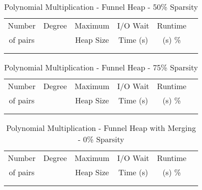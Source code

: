 \documentclass[11pt, one-sided]{amsart}
\begin{document}
\begin{table}[htbp]
   \centering
      \caption{Polynomial Multiplication - Funnel Heap - 50\% Sparsity}
   \begin{tabular}{|c|c|c|c|c|c|}
   	\hline
		 Number   & 	Degree	& Maximum & 	I/O Wait	&  Runtime 	 \\ 
		 of pairs 	&			& Heap Size	& 	Time (s)		&	(s)	 		\%				\\ \hline
		 		&			&			&			&						\\
		 		&			&			&			&						\\
   \end{tabular}
   \label{tab:booktabs}
\end{table}


\begin{table}[htbp]
   \centering
      \caption{Polynomial Multiplication - Funnel Heap - 75\% Sparsity}
   \begin{tabular}{|c|c|c|c|c|c|}
   	\hline
		 Number   & 	Degree	& Maximum & I/O Wait		& Runtime 	 \\ 
		 of pairs 	&			& Heap Size	& Time (s)		&	(s)		 		\%				\\ \hline
		 		&			&			&			&						\\
		 		&			&			&			&						\\
   \end{tabular}
   \label{tab:booktabs}
\end{table}



\newpage


\begin{table}[htbp]
   \centering
      \caption{Polynomial Multiplication - Funnel Heap with Merging - 0\% Sparsity}
   \begin{tabular}{|c|c|c|c|c|c|}
   	\hline
		 Number   & 	Degree	& Maximum & I/O Wait		&  Runtime  \\ 
		 of pairs 	&			& Heap Size	& Time (s)		&	(s)	 		\%				\\ \hline
		 		&			&			&			&						\\
				&			&			&			&						\\
   \end{tabular}
   \label{tab:booktabs}
\end{table}
\end{document}
